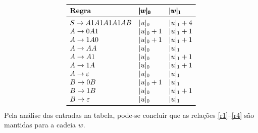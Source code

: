 \documentclass[12pt]{article}
\begin{document}
\begin{tcolorbox}
\begin{description}
		$$
		\begin{array}{lll}
   \toprule
		 \textbf{Regra} & \pmb{|w|_{0}} & \pmb{|w|_{1}}\\ 
 		\midrule
 		S \to A1A1A1A1AB  & |u|_{0}     & |u|_{1} + 4 \\
 		A \to 0A1         & |u|_{0} + 1 & |u|_{1} + 1 \\  
 		A \to 1A0         & |u|_{0} + 1 & |u|_{1} + 1 \\  
 		A \to AA          & |u|_{0}     & |u|_{1}     \\
        A \to A1          & |u|_{0}     & |u|_{1} + 1 \\
        A \to 1A          & |u|_{0}     & |u|_{1} + 1 \\
        A \to \varepsilon & |u|_{0}     & |u|_{1}     \\
 		B \to 0B          & |u|_{0} + 1 & |u|_{1}     \\
        B \to 1B          & |u|_{0}     & |u|_{1} + 1 \\
        B \to \varepsilon & |u|_{0}     & |u|_{1}     \\
 		\bottomrule 
		\end{array} 
		$$
	Pela análise das entradas na tabela, pode-se concluir que as relações \ref{r1}--\ref{r4} são mantidas para a cadeia $w$.
 \end{description}
\end{tcolorbox}
\end{document}
